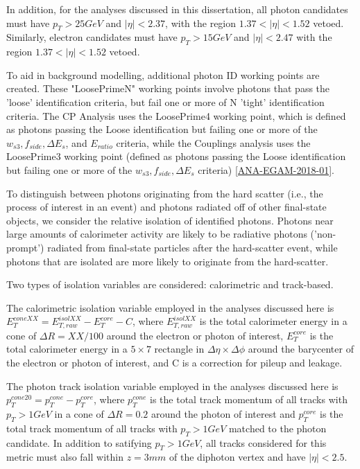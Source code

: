 In addition, for the analyses discussed in this dissertation, all photon candidates must have $p_{T} > 25 GeV$ and $|\eta| < 2.37$, with the region $1.37 < |\eta| < 1.52$ vetoed. Similarly, electron candidates must have $p_{T} > 15 GeV$ and $|\eta| < 2.47$ with the region $1.37 < |\eta| < 1.52$ vetoed.

To aid in background modelling, additional photon ID working points are created. These "LoosePrimeN" working points involve photons that pass the 'loose' identification criteria, but fail one or more of N 'tight' identification criteria. The CP Analysis uses the LoosePrime4 working point, which is defined as photons passing the Loose identification but failing one or more of the $w_{s3}, f_{side}, \Delta E_{s}$, and $E_{ratio}$ criteria, while the Couplings analysis uses the LoosePrime3 working point (defined as photons passing the Loose identification but failing one or more of the $w_{s3}, f_{side}, \Delta E_{s}$ criteria) \ref{ANA-EGAM-2018-01}.

To distinguish between photons originating from the hard scatter (i.e., the process of interest in an event) and photons radiated off of other final-state objects, we consider the relative isolation of identified photons. Photons near large amounts of calorimeter activity are likely to be radiative photons ('non-prompt') radiated from final-state particles after the hard-scatter event, while photons that are isolated are more likely to originate from the hard-scatter.

Two types of isolation variables are considered: calorimetric and track-based.

The calorimetric isolation variable employed in the analyses discussed here is $E_{T}^{coneXX} = E_{T,raw}^{isolXX} -E_{T}^{core} - C$, where $E_{T,raw}^{isolXX}$ is the total calorimeter energy in a cone of $\Delta R = XX/100 $ around the electron or photon of interest, $E_{T}^{core}$ is the total calorimeter energy in a $5 \times 7$ rectangle in $\Delta \eta \times \Delta \phi$ around the barycenter of the electron or photon of interest, and C is a correction for pileup and leakage.

The photon track isolation variable employed in the analyses discussed here is $p_{T}^{cone20} = p_{T}^{cone} - p_{T}^{core}$, where $p_{T}^{cone}$ is the total track momentum of all tracks with $p_{T} > 1GeV$ in a cone of $\Delta R = 0.2$ around the photon of interest and $p_{T}^{core}$ is the total track momentum of all tracks with $p_{T} > 1GeV$ matched to the photon candidate. In addition to satifying $p_{T} > 1GeV$, all tracks considered for this metric must also fall within $z= 3mm$ of the diphoton vertex and have $|\eta|<2.5$.

